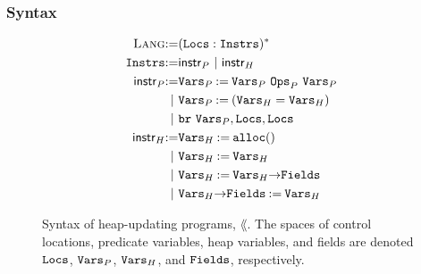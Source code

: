 \subsubsection{Syntax}
\label{sec:syntax}
\begin{figure}
  \centering
  \begin{align}
    \textsc{Lang} \mathbin{:=} & (\mathtt{Locs}: \mathtt{Instrs})^{*} \label{line:prog} \\
    \mathtt{Instrs} \mathbin{:=} & \mathsf{instr}_P\ |\ \mathsf{instr}_H \label{line:instrs} \\
    \mathsf{instr}_P \mathbin{:=} &
    \mathtt{Vars}_P \mathbin{:=} \mathtt{Vars}_P\ \mathtt{Ops}_P\ \mathtt{Vars}_P
    \label{line:bool-op} \\
    |\ & \mathtt{Vars}_P \mathbin{:=} (\mathtt{Vars}_H = \mathtt{Vars}_H)
    \label{line:test-eq} \\
    |\ & \mathtt{br}\ \mathtt{Vars}_P, \mathtt{Locs}, \mathtt{Locs} \label{line:branch} \\
    \mathsf{instr}_H \mathbin{:=} & \mathtt{Vars}_H \mathbin{:=} \mathtt{alloc}()
    \label{line:alloc} \\
    |\ & \mathtt{Vars}_H \mathbin{:=} \mathtt{Vars}_H \label{line:copy} \\
    |\ & \mathtt{Vars}_H \mathbin{:=} \mathtt{Vars}_H \mathtt{->} \mathtt{Fields}
    \label{line:load} \\
    |\ & \mathtt{Vars}_H \mathtt{->} \mathtt{Fields} \mathbin{:=} \mathtt{Vars}_H
    \label{line:store}
  \end{align}
  \caption{Syntax of heap-updating programs, $\lang$.
    The spaces of control locations, predicate variables, heap
    variables, and fields are denoted $\mathtt{Locs}$, $\mathtt{Vars}_P$,
    $\mathtt{Vars}_H$, and $\mathtt{Fields}$, respectively.
  }
  \label{fig:syntax}
\end{figure}

